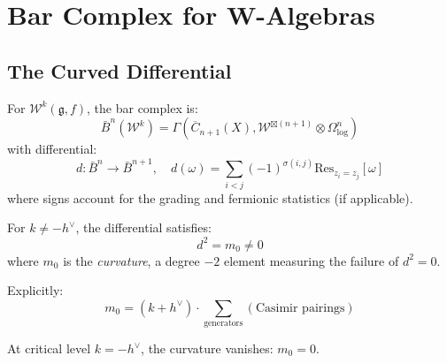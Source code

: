 \section{Bar Complex for W-Algebras}

\subsection{The Curved Differential}

\begin{definition}\label{def:w-bar-complex}
For $\mathcal{W}^k(\mathfrak{g}, f)$, the bar complex is:
\begin{equation}
\bar{B}^n(\mathcal{W}^k) = \Gamma\left(\overline{C}_{n+1}(X), \mathcal{W}^{\boxtimes (n+1)} \otimes \Omega^n_{\log}\right)
\end{equation}
with differential:
\begin{equation}
d: \bar{B}^n \to \bar{B}^{n+1}, \quad d(\omega) = \sum_{i<j} (-1)^{\sigma(i,j)} \mathrm{Res}_{z_i=z_j}[\omega]
\end{equation}
where signs account for the grading and fermionic statistics (if applicable).
\end{definition}

\begin{theorem}\label{thm:w-bar-curvature}
For $k \neq -h^\vee$, the differential satisfies:
\begin{equation}
d^2 = m_0 \neq 0
\end{equation}
where $m_0$ is the \emph{curvature}, a degree $-2$ element measuring the failure of $d^2 = 0$.

Explicitly:
\begin{equation}
m_0 = (k + h^\vee) \cdot \sum_{\text{generators}} (\text{Casimir pairings})
\end{equation}

At critical level $k = -h^\vee$, the curvature vanishes: $m_0 = 0$.
\end{theorem}

